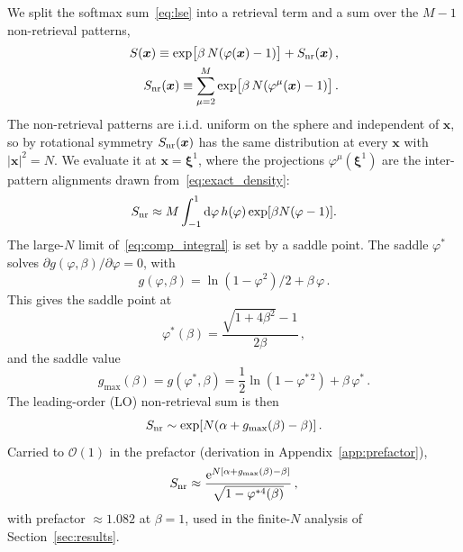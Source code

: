 \documentclass[letterpaper]{article} %
\newcommand{\bxi}{\boldsymbol{\xi}}
\newcommand{\bx}{\bm{x}}
\newcommand{\e}{{\mathrm{e}}}
\newcommand{\dd}{{\mathrm{d}}}
\newcommand{\Bnet}{\beta}
\newcommand{\p}{\partial}
\begin{document}
We split the softmax sum~\eqref{eq:lse} into a retrieval term and a sum over the $M-1$ non-retrieval patterns,
\begin{align}
S(\bx) \equiv \exp\!\big[\Bnet\,N (\varphi(\bx) - 1)\big] + S_{\rm nr}(\bx)\,,
\label{eq:softmax_sum}\\
S_{\rm nr}(\bx) \equiv \sum_{\mu=2}^{M} \exp\!\big[\Bnet\,N (\varphi^\mu(\bx) - 1)\big]\,.
\label{eq:comp_sum}
\end{align}
The non-retrieval patterns are i.i.d. uniform on the sphere and independent of $\bm x$, so by rotational symmetry $S_{\rm nr}(\bm x)$ has the same distribution at every $\bm x$ with $|\bm x|^2 = N$. We evaluate it at $\bm x = \bxi^1$, where the projections $\varphi^\mu(\bxi^1)$ are the inter-pattern alignments drawn from~\eqref{eq:exact_density}:
\begin{equation}
    S_{\rm nr} \approx M \int_{-1}^{1} \dd\varphi\, h(\varphi) \exp[\Bnet N(\varphi - 1)].
    \label{eq:comp_integral}
\end{equation}
The large-$N$ limit of~\eqref{eq:comp_integral} is set by a saddle point. The
saddle $\varphi^*$ solves $\p g(\varphi, \Bnet)/\p\varphi = 0$, with
\begin{equation}
    g(\varphi, \Bnet) = \ln(1-\varphi^2)/2 + \Bnet\,\varphi\,.
\end{equation}
This gives the saddle point at
\begin{equation}
\varphi^*(\Bnet) = \frac{\sqrt{1+4\Bnet^2} - 1}{2\Bnet}\,,
\label{eq:saddle}
\end{equation}
and the saddle value
\begin{equation}
g_{\max}(\Bnet) = g(\varphi^*, \Bnet) = \frac12 \ln(1 - \varphi^{*\,2}) + \Bnet\,\varphi^*\,.
\label{eq:saddle_value}
\end{equation}
The leading-order (LO) non-retrieval sum is then
\begin{equation}
    S_{\rm nr} \sim \exp[N(\alpha + g_{\max}(\Bnet) - \Bnet)]\,.
    \label{eq:comp_saddle}
\end{equation}
Carried to $\mathcal{O}(1)$ in the prefactor (derivation in Appendix~\ref{app:prefactor}),
\begin{equation}
    S_{\rm nr} \approx \frac{\e^{N[\alpha + g_{\max}(\Bnet) - \Bnet]}}{\sqrt{1-\varphi^{*4}(\Bnet)}}\,,
    \label{eq:comp_laplace}
\end{equation}
with prefactor $\approx 1.082$ at $\Bnet = 1$, used in the finite-$N$ analysis of Section~\ref{sec:results}.
\end{document}
